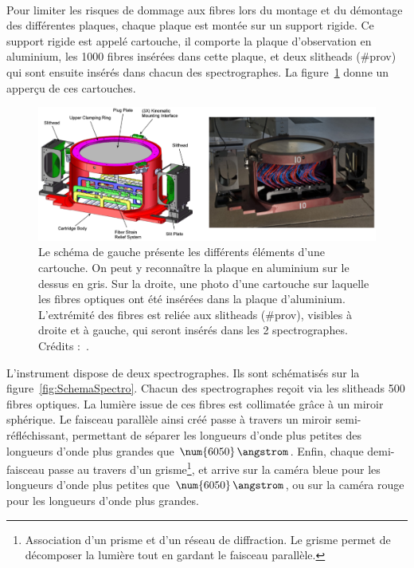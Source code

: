 \documentclass[11pt, twoside, a4paper, openright]{report}
\begin{document}
\paragraph{} Pour limiter les risques de dommage aux fibres lors du montage et du démontage des différentes plaques, chaque plaque est montée sur un support rigide. Ce support rigide est appelé cartouche, il comporte la plaque d'observation en aluminium, les \num{1000} fibres insérées dans cette plaque, et deux slitheads (\#prov) qui sont ensuite insérés dans chacun des spectrographes. La figure~\ref{fig:CartoucheImage} donne un apperçu de ces cartouches.\\
\begin{figure}
  \centering
  \includegraphics[scale=0.35]{../img/eBOSS/CartoucheImage}
  \caption{Le schéma de gauche présente les différents éléments d'une cartouche. On peut y reconnaître la plaque en aluminium sur le dessus en gris. Sur la droite, une photo d'une cartouche sur laquelle les fibres optiques ont été insérées dans la plaque d'aluminium. L'extrémité des fibres est reliée aux slitheads (\#prov), visibles à droite et à gauche, qui seront insérés dans les 2 spectrographes. Crédits :~\cite{Smee2012}.}
  \label{fig:CartoucheImage}
\end{figure}
L'instrument dispose de deux spectrographes. Ils sont schématisés sur la figure~\ref{fig:SchemaSpectro}. Chacun des spectrographes reçoit via les slitheads \num{500} fibres optiques. La lumière issue de ces fibres est collimatée grâce à un miroir sphérique. Le faisceau parallèle ainsi créé passe à travers un miroir semi-réfléchissant, permettant de séparer les longueurs d'onde plus petites des longueurs d'onde plus grandes que $\num{6050}\,\angstrom$. Enfin, chaque demi-faisceau passe au travers d'un grisme\footnote{Association d'un prisme et d'un réseau de diffraction. Le grisme permet de décomposer la lumière tout en gardant le faisceau parallèle.}, et arrive sur la caméra bleue pour les longueurs d'onde plus petites que $\num{6050}\,\angstrom$, ou sur la caméra rouge pour les longueurs d'onde plus grandes. 
\end{document}
